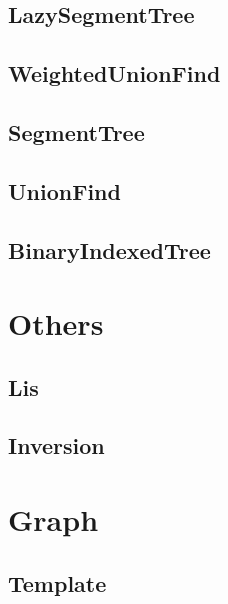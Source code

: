 \documentclass[titlepage, landscape, a4paper, twocolumn, 10pt]{ujarticle}
\begin{document}
\subsection{LazySegmentTree}


\subsection{WeightedUnionFind}


\subsection{SegmentTree}


\subsection{UnionFind}


\subsection{BinaryIndexedTree}



\section{Others}

\subsection{Lis}


\subsection{Inversion}



\section{Graph}

\subsection{Template}

\end{document}

